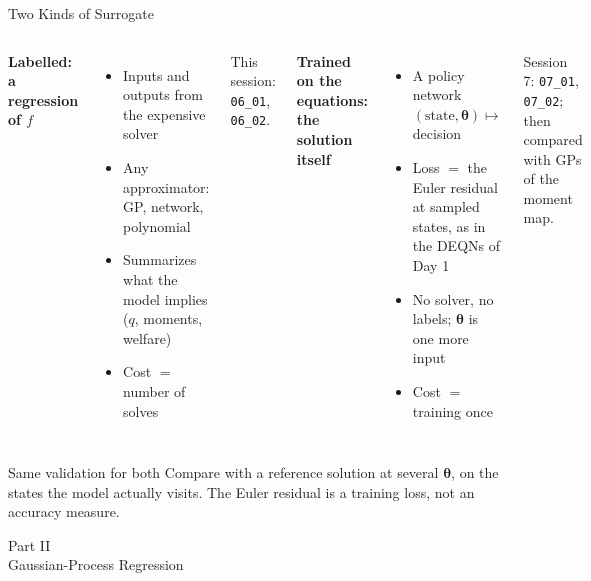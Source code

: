 \documentclass[aspectratio=169,11pt]{beamer}
\newcommand{\str}{\bm{\theta}}          %
\begin{document}
\begin{frame}{Two Kinds of Surrogate}
\small
\begin{columns}[T]
\textbf{Labelled: a regression of $f$}
\begin{itemize}\itemsep2pt
  \item Inputs and outputs from the expensive solver
  \item Any approximator: GP, network, polynomial
  \item Summarizes what the model implies ($q$, moments, welfare)
  \item Cost $=$ number of solves
\end{itemize}
\vspace{0.1cm}
{\footnotesize This session: \texttt{06\_01}, \texttt{06\_02}.}

\textbf{Trained on the equations: the solution itself}
\begin{itemize}\itemsep2pt
  \item A policy network $(\text{state}, \str) \mapsto$ decision
  \item Loss $=$ the Euler residual at sampled states, as in the DEQNs of Day 1
  \item No solver, no labels; $\str$ is one more input
  \item Cost $=$ training once
\end{itemize}
\vspace{0.1cm}
{\footnotesize Session 7: \texttt{07\_01}, \texttt{07\_02}; then compared with GPs of the moment map.}
\end{columns}

\vspace{0.3cm}
\begin{alertblock}{Same validation for both}
Compare with a reference solution at several $\str$, on the states the model actually visits. The Euler residual is a training loss, not an accuracy measure.
\end{alertblock}
\end{frame}


\begin{frame}{}
\begin{center}
{\Huge \textcolor{uzhblue}{Part II}}\\[0.8em]
{\LARGE Gaussian-Process Regression}
\end{center}
\end{frame}
\end{document}
